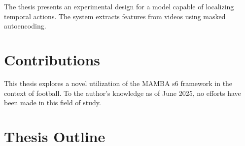 The thesis presents an experimental design for a model capable of localizing temporal actions. The system extracts features from videos using masked autoencoding.

\section{Contributions}

This thesis explores a novel utilization of the MAMBA \acrshort{s6} framework in the context of football. To the author's knowledge as of June 2025, no efforts have been made in this field of study. 

\section{Thesis Outline}

